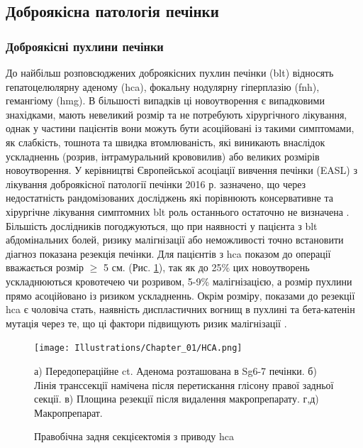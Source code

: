 \begin{refsection}
\subsection{Доброякісна патологія печінки}

\subsubsection{Доброякісні пухлини печінки}

До найбільш розповсюджених доброякісних пухлин печінки (\acrshort{blt}) відносять гепатоцелюлярну аденому (\acrshort{hca}), фокальну нодулярну гіперплазію (\acrshort{fnh}), гемангіому (\acrshort{hmg}). В більшості випадків ці новоутворення є випадковими знахідками, мають невеликий розмір та не потребують хірургічного лікування, однак у частини пацієнтів вони можуть бути асоційовані із такими симптомами, як слабкість, тошнота та швидка втомлюваність, які виникають внаслідок ускладненнь (розрив, інтрамуральний крововилив) або великих розмірів новоутворення. У керівництві Європейської асоціації вивчення печінки (EASL) з лікування доброякісної патології печінки 2016 р. зазначено, що через недостатність рандомізованих досліджень які порівнюють консервативне та хірургічне лікування симптомних \acrshort{blt} роль останнього остаточно не визначена \cite{Colombo2016}. Більшість дослідників погоджуються, що при наявності у пацієнта з \acrshort{blt} абдомінальних болей, ризику малігнізації або неможливості точно встановити діагноз показана резекція печінки. Для пацієнтів з \acrshort{hca} показом до операції вважається розмір $\geq$ 5 см. (Рис. \ref{fig:HCA}), так як до 25\% цих новоутворень ускладнюються кровотечею чи розривом, 5-9\% малігнізацією, а розмір пухлини прямо асоційовано із ризиком ускладненнь. Окрім розміру, показами до резекції \acrshort{hca} є чоловіча стать, наявність диспластичних вогнищ в пухлині та  бета-катенін мутація через те, що ці фактори підвищують ризик малігнізації \cite{Ercolani2015}.


\begin{figure}[!ht]
\caption{Правобічна задня секцієектомія з приводу \acrshort{hca}}

\texttt{[image: Illustrations/Chapter\_01/HCA.png]}
\label{fig:HCA}

\medskip
\small
а) Передопераційне \acrshort{ct}. Аденома розташована в Sg6-7 печінки. б) Лінія транссекції намічена після перетискання глісону правої задньої секції. в) Площина резекції після видалення макропрепарату. г,д) Макропрепарат.


\end{figure}
\end{refsection}
